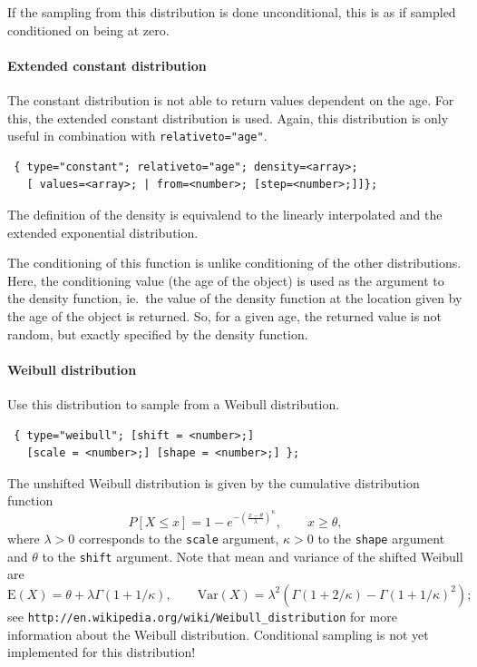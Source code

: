 \documentclass[11pt]{article}
\begin{document}
If the sampling from this distribution is done unconditional, this is as if
sampled conditioned on being at zero.

\paragraph{Extended constant distribution}

The constant distribution is not able to return values dependent on the age.
For this, the extended constant distribution is used. Again, this distribution
is only useful in combination with \texttt{relativeto="age"}.
\begin{verbatim}
 { type="constant"; relativeto="age"; density=<array>; 
   [ values=<array>; | from=<number>; [step=<number>;]]};
\end{verbatim}
The definition of the density is equivalend to the linearly interpolated and
the extended exponential distribution. 

The conditioning of this function is unlike conditioning of the other
distributions. Here, the conditioning value (the age of the object) is used as
the argument to the density function, ie.\ the value of the density function at
the location given by the age of the object is returned. So, for a given age,
the returned value is not random, but exactly specified by the density function.

\paragraph{Weibull distribution}

Use this distribution to sample from a Weibull distribution. 
\begin{verbatim}
 { type="weibull"; [shift = <number>;] 
   [scale = <number>;] [shape = <number>;] };
\end{verbatim}
The unshifted Weibull distribution is given by the cumulative distribution
function
\begin{equation}
 P[X\leq x] = 1-e^{-\left(\frac{x-\theta}{\lambda}\right)^\kappa},
	\qquad x\geq \theta,
\end{equation}
where $\lambda>0$ corresponds to the \texttt{scale} argument, $\kappa>0$
to the \texttt{shape} argument and $\theta$ to the \texttt{shift}
argument. Note that mean and variance of the shifted Weibull are 
\begin{equation}
\mathrm{E}(X) = \theta + \lambda\Gamma(1+1/\kappa), \qquad
\mathrm{Var}(X) = \lambda^2\left(\Gamma(1+2/\kappa)-\Gamma(1+1/\kappa)^2\right);
\end{equation}
see \texttt{http://en.wikipedia.org/wiki/Weibull\_distribution} for
more information about the Weibull distribution. Conditional sampling is not yet implemented for this distribution!
\end{document}
